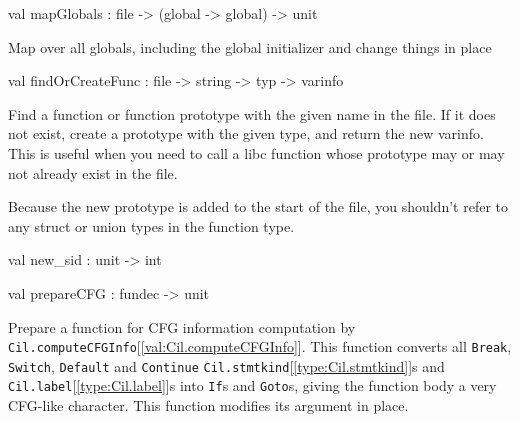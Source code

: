 \documentclass[11pt]{article}
\begin{document}
\label{val:Cil.mapGlobals}\begin{ocamldoccode}
val mapGlobals : file -> (global -> global) -> unit
\end{ocamldoccode}
\begin{ocamldocdescription}
Map over all globals, including the global initializer and change things 
    in place


\end{ocamldocdescription}




\label{val:Cil.findOrCreateFunc}\begin{ocamldoccode}
val findOrCreateFunc : file -> string -> typ -> varinfo
\end{ocamldoccode}
\begin{ocamldocdescription}
Find a function or function prototype with the given name in the file.
 If it does not exist, create a prototype with the given type, and return
 the new varinfo.  This is useful when you need to call a libc function
 whose prototype may or may not already exist in the file.


 Because the new prototype is added to the start of the file, you shouldn't
 refer to any struct or union types in the function type.


\end{ocamldocdescription}




\label{val:Cil.new-underscoresid}\begin{ocamldoccode}
val new_sid : unit -> int
\end{ocamldoccode}




\label{val:Cil.prepareCFG}\begin{ocamldoccode}
val prepareCFG : fundec -> unit
\end{ocamldoccode}
\begin{ocamldocdescription}
Prepare a function for CFG information computation by
 {\tt{Cil.computeCFGInfo}}[\ref{val:Cil.computeCFGInfo}]. This function converts all {\tt{Break}}, {\tt{Switch}},
 {\tt{Default}} and {\tt{Continue}} {\tt{Cil.stmtkind}}[\ref{type:Cil.stmtkind}]s and {\tt{Cil.label}}[\ref{type:Cil.label}]s into {\tt{If}}s
 and {\tt{Goto}}s, giving the function body a very CFG-like character. This
 function modifies its argument in place.


\end{ocamldocdescription}
\end{document}

